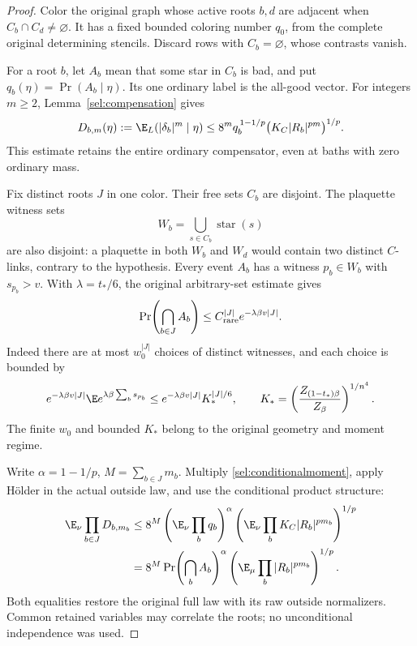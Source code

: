 \begin{proof}
Color the original graph whose active roots \(b,d\) are adjacent when \(C_b\cap C_d\ne\varnothing\). It has a fixed bounded coloring number \(q_0\), from the complete original determining stencils. Discard rows with \(C_b=\varnothing\), whose contrasts vanish.

For a root \(b\), let \(A_b\) mean that some star in \(C_b\) is bad, and put \(q_b(\eta)=\Pr(A_b\mid\eta)\). Its one ordinary label is the all-good vector. For integers \(m\ge2\), Lemma~\ref{sel:compensation} gives
\begin{equation}
 D_{b,m}(\eta):=\E_L(|\delta_b|^m\mid\eta)
 \le8^m q_b^{\,1-1/p}
                   \bigl(K_C|R_b|^{pm}\bigr)^{1/p}.
 \label{sel:conditionalmoment}
\end{equation}
This estimate retains the entire ordinary compensator, even at baths with zero ordinary mass.

Fix distinct roots \(J\) in one color. Their free sets \(C_b\) are disjoint. The plaquette witness sets
\[
 W_b=\bigcup_{s\in C_b}\operatorname{star}(s)
\]
are also disjoint: a plaquette in both \(W_b\) and \(W_d\) would contain two distinct \(C\)-links, contrary to the hypothesis. Every event \(A_b\) has a witness \(p_b\in W_b\) with \(s_{p_b}>v\). With \(\lambda=t_*/6\), the original arbitrary-set estimate gives
\begin{equation}
 \Pr\!\left(\bigcap_{b\in J}A_b\right)
 \le C_{\rm rare}^{|J|}e^{-\lambda\beta v|J|}.
 \label{sel:jointrare}
\end{equation}
Indeed there are at most \(w_0^{|J|}\) choices of distinct witnesses, and each choice is bounded by
\[
 e^{-\lambda\beta v|J|}
 \E e^{\lambda\beta\sum_b s_{p_b}}
 \le e^{-\lambda\beta v|J|}K_*^{|J|/6},
 \qquad K_*=\left(\frac{Z_{(1-t_*)\beta}}{Z_\beta}\right)^{1/n^4}.
\]
The finite \(w_0\) and bounded \(K_*\) belong to the original geometry and moment regime.

Write \(\alpha=1-1/p\), \(M=\sum_{b\in J}m_b\). Multiply \eqref{sel:conditionalmoment}, apply Hölder in the actual outside law, and use the conditional product structure:
\begin{align}
 \E_\nu\prod_{b\in J}D_{b,m_b}
 &\le8^M
       \left(\E_\nu\prod_bq_b\right)^\alpha
       \left(\E_\nu\prod_bK_C|R_b|^{pm_b}\right)^{1/p}\notag\\
 &=8^M\Pr\!\left(\bigcap_bA_b\right)^\alpha
       \left(\E_\mu\prod_b|R_b|^{pm_b}\right)^{1/p}.
 \label{sel:mixedholder}
\end{align}
Both equalities restore the original full law with its raw outside normalizers. Common retained variables may correlate the roots; no unconditional independence was used.


\end{proof}
